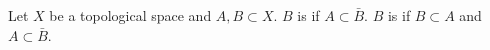 Let $X$ be a topological space and $A, B \subset X$. $B$ is  if $A \subset \bar{B}$. $B$ is  if $B \subset A$ and $A \subset \bar{B}$.

